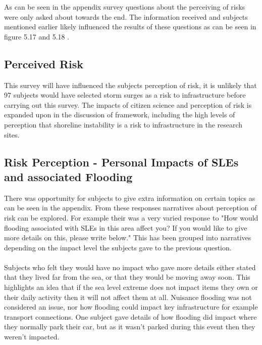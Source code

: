 As can be seen in the appendix survey questions about the perceiving of risks were only asked about towards the end. The information received and subjects mentioned earlier likely influenced the results of these questions as can be seen in figure 5.17 and 5.18 .
\paragraph{}
\subsection{Perceived Risk}
This survey will have influenced the subjects perception of risk, it is unlikely that 97 subjects would have selected storm surges as a risk to infrastructure before carrying out this survey. The impacts of citizen science and perception of risk is expanded upon in the discussion of framework, including the high levels of perception that shoreline instability is a risk to infrastructure in the research sites.

\subsection{Risk Perception - Personal Impacts of SLEs and associated Flooding}
There was opportunity for subjects to give extra information on certain topics as can be seen in the appendix. From these responses narratives about perception of risk can be explored. For example their was a very varied response to "How would flooding associated with SLEs in this area affect you? If you would like to give more details on this, please write below." This has been grouped into narratives depending on the impact level the subjects gave to the previous question.
\paragraph{}

Subjects who felt they would have no impact who gave more details either stated that they lived far from the sea, or that they would be moving away soon. This highlights an idea that if the sea level extreme does not impact items they own or their daily activity then it will not affect them at all. Nuisance flooding was not considered an issue, nor how flooding could impact key infrastructure for example transport connections. One subject gave details of how flooding did impact where they normally park their car, but as it wasn't parked during this event then they weren't impacted. 
